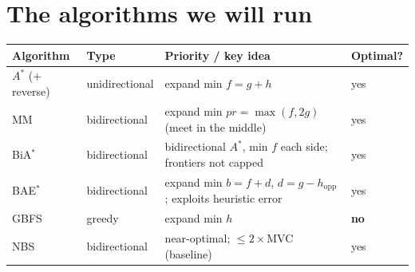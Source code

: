 \documentclass[11pt]{article}
\begin{document}
\section{The algorithms we will run}
\label{sec:algorithms}

\begin{center}
\renewcommand{\arraystretch}{1.3}
\begin{longtable}{@{}p{2.1cm}p{2.2cm}p{5.4cm}p{1.4cm}@{}}
\toprule
\textbf{Algorithm} & \textbf{Type} & \textbf{Priority / key idea} & \textbf{Optimal?}\\
\midrule
$A^{*}$ (+ reverse) & unidirectional & expand min $f=g+h$ & yes\\
MM & bidirectional & expand min $\mathit{pr}=\max(f,2g)$ (meet in the middle) & yes\\
BiA$^{*}$ & bidirectional & bidirectional $A^{*}$, min $f$ each side; frontiers not capped & yes\\
BAE$^{*}$ & bidirectional & expand min $b=f+d$, $d=g-h_{\text{opp}}$; exploits heuristic error & yes\\
GBFS & greedy & expand min $h$ & \textbf{no}\\
NBS & bidirectional & near-optimal; $\le 2\times$MVC (baseline) & yes\\
\bottomrule
\end{longtable}
\end{center}
\end{document}
